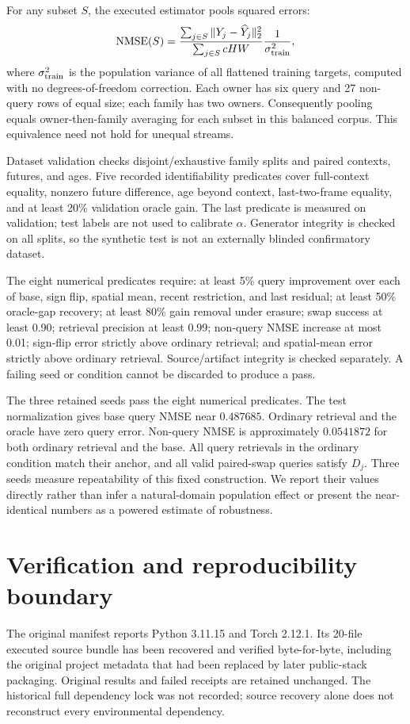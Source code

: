 \documentclass[11pt]{article}
\begin{document}
For any subset $S$, the executed estimator pools squared errors:
\begin{equation}
 \mathrm{NMSE}(S)=
 \frac{\sum_{j\in S}\|Y_j-\widehat Y_j\|_2^2}
      {\sum_{j\in S}cHW}\frac{1}{\sigma^2_{\rm train}},
\end{equation}
where $\sigma^2_{\rm train}$ is the population variance of all flattened
training targets, computed with no degrees-of-freedom correction. Each owner
has six query and 27 non-query rows of equal size; each family has two owners.
Consequently pooling equals owner-then-family averaging for each subset in
this balanced corpus. This equivalence need not hold for unequal streams.

Dataset validation checks disjoint/exhaustive family splits and paired
contexts, futures, and ages. Five recorded identifiability predicates cover
full-context equality, nonzero future difference, age beyond context,
last-two-frame equality, and at least 20\% validation oracle gain. The last
predicate is measured on validation; test labels are not used to calibrate
$\alpha$. Generator integrity is checked on all splits, so the synthetic test
is not an externally blinded confirmatory dataset.

The eight numerical predicates require: at least 5\% query improvement over
each of base, sign flip, spatial mean, recent restriction, and last residual;
at least 50\% oracle-gap recovery; at least 80\% gain removal under erasure;
swap success at least 0.90; retrieval precision at least 0.99; non-query NMSE
increase at most 0.01; sign-flip error strictly above ordinary retrieval; and
spatial-mean error strictly above ordinary retrieval. Source/artifact integrity
is checked separately. A failing seed or condition cannot be discarded to
produce a pass.


The three retained seeds pass the eight numerical predicates. The test
normalization gives base query NMSE near $0.487685$. Ordinary retrieval and
the oracle have zero query error. Non-query NMSE is approximately $0.0541872$
for both ordinary retrieval and the base. All query retrievals in the ordinary
condition match their anchor, and all valid paired-swap queries satisfy $D_j$.
Three seeds measure repeatability of this fixed construction. We report their
values directly rather than infer a natural-domain population effect or
present the near-identical numbers as a powered estimate of robustness.

\section{Verification and reproducibility boundary}
The original manifest reports Python 3.11.15 and Torch 2.12.1. Its 20-file
executed source bundle has been recovered and verified byte-for-byte, including
the original project metadata that had been replaced by later public-stack
packaging. Original results and failed receipts are retained unchanged. The
historical full dependency lock was not recorded; source recovery alone does
not reconstruct every environmental dependency.
\end{document}
